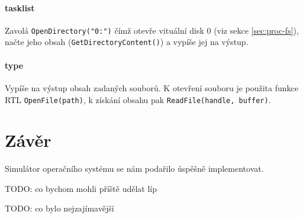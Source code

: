 \documentclass[11pt,a4paper]{scrartcl}
\begin{document}
	\paragraph{tasklist}
	Zavolá \verb|OpenDirectory("0:")| čímž otevře vituální disk 0 (viz sekce \ref{sec:proc-fs}), načte jeho obsah (\verb|GetDirectoryContent()|) a vypíše jej na výstup.
	
	\paragraph{type}
	Vypíše na výstup obsah zadaných souborů. K otevření souboru je použita funkce RTL \verb|OpenFile(path)|, k získání obsahu pak \verb|ReadFile(handle, buffer)|.
	
	\section{Závěr}
	Simulátor operačního systému se nám podařilo úspěšně implementovat. 
	
	TODO: co bychom mohli příště udělat líp 
	
	TODO: co bylo nejzajímavější
	
\end{document}
